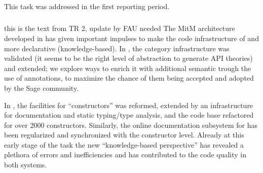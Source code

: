 \subparagraph{}
\label{dksbases@data-foundationCAS}
This task was addressed in the first reporting period.
%
%
\medskip

\subparagraph{}
\label{dksbases@data-research-categories}

\begin{oldpart}{this is the text from TR 2, update by FAU needed}
The MitM architecture developed in  has given important impulses to make the code infrastructure of \Sage and \GAP more declarative (knowledge-based).
In \Sage, the category infrastructure was validated (it seems to be the right level of abstraction to generate API theories) and extended; we explore ways to enrich it with additional semantic
trough the use of annotations, to maximize the chance of
them being accepted and adopted by the Sage community.

In \GAP, the facilities for ``constructors'' was reformed, extended by an infrastructure for documentation and static typing/type analysis, and the code base refactored for over 2000 constructors.
Similarly, the online documentation subsystem for \GAP has been regularized and synchronized with the constructor level.
Already at this early stage of the task the new ``knowledge-based perspective'' has revealed a plethora of errors and inefficiencies and has contributed to the code quality in both systems.
\end{oldpart}
\medskip


